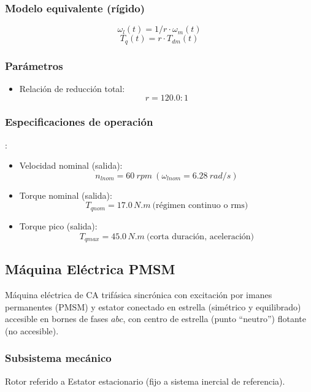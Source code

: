 \documentclass[a4paper, 10pt, onecolumn,journal]{ieeeconf}
\begin{document}
\subsubsection{\textbf{Modelo equivalente (rígido)}}
\begin{equation}
    \omega_l(t) = 1/r \cdot \omega_m(t)
    \label{relación de velocidad en caja}
\end{equation}
\begin{equation}
    T_q(t) = r \cdot T_{dm}(t)
    \label{relación de torque en caja}
\end{equation}



\subsubsection{\textbf{Parámetros}}
\begin{itemize}
    \item Relación de reducción total:
    \[
    r = 120.0 : 1
    \]
\end{itemize}



\subsubsection{\textbf{Especificaciones de operación}}:
\begin{itemize}
    \item Velocidad nominal (salida):
    \[
    n_{lnom} = 60\ rpm \ (\omega_{lnom} = 6.28 \ rad/s)
    \]
    \item Torque nominal (salida):
    \[
    T_{qnom} = 17.0 \, N.m \ \text{(régimen continuo o rms)}
    \]
    \item Torque pico (salida):
    \[
    T_{qmax} = 45.0 \, N.m \ \text{(corta duración, aceleración)}
    \]
\end{itemize}



\subsection{\textbf{Máquina Eléctrica PMSM}}
Máquina eléctrica de CA trifásica sincrónica con excitación por imanes permanentes (PMSM) y estator conectado en estrella (simétrico y equilibrado) accesible en bornes de fases $abc$, con centro de estrella (punto “neutro”) flotante (no accesible).



\subsubsection{\textbf{Subsistema mecánico}}
Rotor referido a Estator estacionario (fijo a sistema inercial de referencia).
\end{document}
